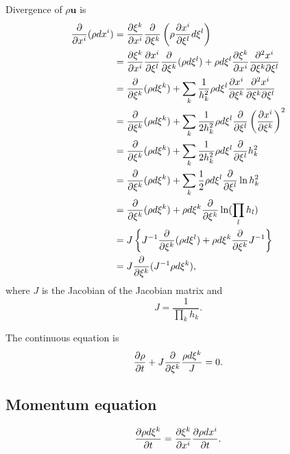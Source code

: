 Divergence of $\rho \bm{u}$ is
\begin{align}
  \frac{\partial }{\partial x^i}(\rho dx^i)
  &= \frac{\partial \xi^k}{\partial x^i}\frac{\partial }{\partial \xi^k}\left(\rho \frac{\partial x^i}{\partial \xi^l}d\xi^l\right) \nonumber \\
  &= \frac{\partial \xi^k}{\partial x^i}\frac{\partial x^i}{\partial \xi^l}\frac{\partial }{\partial \xi^k}(\rho d\xi^l)
    +\rho d\xi^l \frac{\partial \xi^k}{\partial x^i} \frac{\partial^2 x^i}{\partial \xi^k \partial \xi^l} \nonumber\\
  &= \frac{\partial }{\partial \xi^k} (\rho d\xi^k) + \sum_k\frac{1}{h_k^2}\rho d\xi^l \frac{\partial x^i}{\partial \xi^k}\frac{\partial^2 x^i}{\partial \xi^k \partial \xi^l} \nonumber\\
  &= \frac{\partial }{\partial \xi^k} (\rho d\xi^k) + \sum_k \frac{1}{2h_k^2}\rho d\xi^l \frac{\partial }{\partial \xi^l}\left(\frac{\partial x^i}{\partial \xi^k}\right)^2 \nonumber\\
  &= \frac{\partial }{\partial \xi^k} (\rho d\xi^k) + \sum_k \frac{1}{2h_k^2}\rho d\xi^l \frac{\partial }{\partial \xi^l}h_k^2 \nonumber\\
  &= \frac{\partial }{\partial \xi^k} (\rho d\xi^k) + \sum_k \frac{1}{2}\rho d\xi^l \frac{\partial }{\partial \xi^l}\ln h_k^2 \nonumber\\
  &= \frac{\partial }{\partial \xi^k} (\rho d\xi^k) + \rho d\xi^k \frac{\partial }{\partial \xi^k}\ln (\prod_l h_l) \nonumber\\
  &= J \left\{ J^{-1}\frac{\partial }{\partial \xi^k} (\rho d\xi^l) + \rho d\xi^k \frac{\partial }{\partial \xi^k}J^{-1}\right\} \nonumber\\
  &= J \frac{\partial }{\partial \xi^k} (J^{-1}\rho d\xi^k),
\end{align}
where $J$ is the Jacobian of the Jacobian matrix and
\begin{equation}
  J = \frac{1}{\prod_k h_k}.
\end{equation}

The continuous equation is
\begin{equation}
\frac{\partial \rho}{\partial t} + J \frac{\partial }{\partial \xi^k}\frac{\rho d\xi^k}{J} = 0.
\end{equation}



\subsection{Momentum equation}

\begin{equation}
  \frac{\partial \rho d\xi^k}{\partial t} = \frac{\partial \xi^k}{\partial x^i} \frac{\partial \rho dx^i}{\partial t}.
\end{equation}

